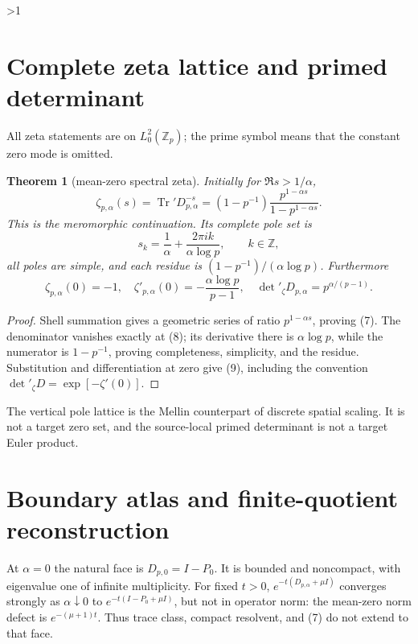\documentclass[10pt]{article}
\providecommand{\CRevisionRound}{2}
\newtheorem{theorem}{Theorem}
\newcommand{\Zp}{\mathbb Z_p}
\newcommand{\Tr}{\operatorname{Tr}}
\begin{document}
\ifnum\CRevisionRound>1
\section{Complete zeta lattice and primed determinant}
All zeta statements are on $L^2_0(\Zp)$; the prime symbol means that the
constant zero mode is omitted.

\begin{theorem}[mean-zero spectral zeta]
Initially for $\Re s>1/\alpha$,
\begin{equation}
 \zeta_{p,\alpha}(s)=\Tr' D_{p,\alpha}^{-s}
 =(1-p^{-1})\frac{p^{1-\alpha s}}{1-p^{1-\alpha s}}.       \tag{7}
\end{equation}
This is the meromorphic continuation.  Its complete pole set is
\begin{equation}
 s_k=\frac1\alpha+\frac{2\pi i k}{\alpha\log p},
 \qquad k\in\mathbb Z,                                   \tag{8}
\end{equation}
all poles are simple, and each residue is
$(1-p^{-1})/(\alpha\log p)$.  Furthermore
\begin{equation}
 \zeta_{p,\alpha}(0)=-1,
 \quad \zeta'_{p,\alpha}(0)=-\frac{\alpha\log p}{p-1},
 \quad \det{}'_{\zeta}D_{p,\alpha}=p^{\alpha/(p-1)}.      \tag{9}
\end{equation}
\end{theorem}
\begin{proof}
Shell summation gives a geometric series of ratio $p^{1-\alpha s}$, proving
(7).  The denominator vanishes exactly at (8); its derivative there is
$\alpha\log p$, while the numerator is $1-p^{-1}$, proving completeness,
simplicity, and the residue.  Substitution and differentiation at zero give
(9), including the convention $\det{}'_\zeta D=\exp[-\zeta'(0)]$.
\end{proof}

The vertical pole lattice is the Mellin counterpart of discrete spatial
scaling.  It is not a target zero set, and the source-local primed determinant
is not a target Euler product.

\section{Boundary atlas and finite-quotient reconstruction}
At $\alpha=0$ the natural face is $D_{p,0}=I-P_0$.  It is bounded and
noncompact, with eigenvalue one of infinite multiplicity.  For fixed $t>0$,
$e^{-t(D_{p,\alpha}+\mu I)}$ converges strongly as $\alpha\downarrow0$ to
$e^{-t(I-P_0+\mu I)}$, but not in operator norm: the mean-zero norm defect is
$e^{-(\mu+1)t}$.  Thus trace class, compact resolvent, and (7) do not extend to
that face.
\end{document}

